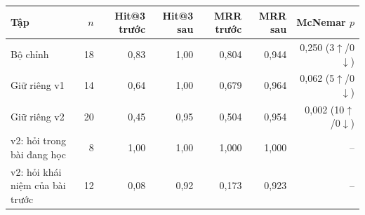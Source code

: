 \small
\begin{tabular}{@{}lrrrrrr@{}}
\toprule
Tập & $n$ & Hit@3 trước & Hit@3 sau & MRR trước & MRR sau & McNemar $p$ \\
\midrule
Bộ chỉnh & 18 & 0,83 & 1,00 & 0,804 & 0,944 & 0,250 (3$\uparrow$/0$\downarrow$) \\
Giữ riêng v1 & 14 & 0,64 & 1,00 & 0,679 & 0,964 & 0,062 (5$\uparrow$/0$\downarrow$) \\
Giữ riêng v2 & 20 & 0,45 & 0,95 & 0,504 & 0,954 & 0,002 (10$\uparrow$/0$\downarrow$) \\
\midrule
v2: hỏi trong bài đang học & 8 & 1,00 & 1,00 & 1,000 & 1,000 & -- \\
v2: hỏi khái niệm của bài trước & 12 & 0,08 & 0,92 & 0,173 & 0,923 & -- \\
\bottomrule
\end{tabular}
